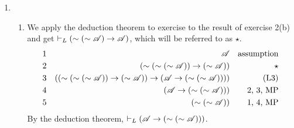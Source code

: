 \begin{enumerate}
\begin{enumerate}[label=(\alph*)]
      \item
        
      \item {}
    \end{enumerate}

  \item %
    \begin{enumerate}[label=(\alph*)]
      \item We apply the deduction theorem to exercise to the result of exercise 2(b) and get \(\vdash_{L} (\sim(\sim\mathscr{A}) \rightarrow \mathscr{A})\), which will be referred to as \(\star\).
        \begin{align*}
          \text{1}&&
          \mathscr{A}&&
          \text{assumption}\\
          \text{2}&&
          (\sim(\sim(\sim\mathscr{A})) \rightarrow (\sim\mathscr{A}))&&
          \star\\
          \text{3}&&
          ((\sim(\sim(\sim\mathscr{A})) \rightarrow (\sim\mathscr{A})) \rightarrow (\mathscr{A} \rightarrow (\sim(\sim\mathscr{A}))))&&
          \text{(L3)}\\
          \text{4}&&
          (\mathscr{A} \rightarrow (\sim(\sim\mathscr{A})))&&
          \text{2, 3, MP}\\
          \text{5}&&
          (\sim(\sim\mathscr{A}))&&
          \text{1, 4, MP}
        \end{align*}
      By the deduction theorem, \(\vdash_{L} (\mathscr{A} \rightarrow (\sim(\sim\mathscr{A})))\).


\end{enumerate}
\end{enumerate}
